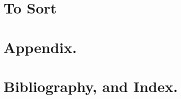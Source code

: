 \documentclass[12pt,leqno]{book}
\begin{document}
\part{To Sort}



























\part{Appendix.}



\part{Bibliography, and Index.}


%





\end{document}
